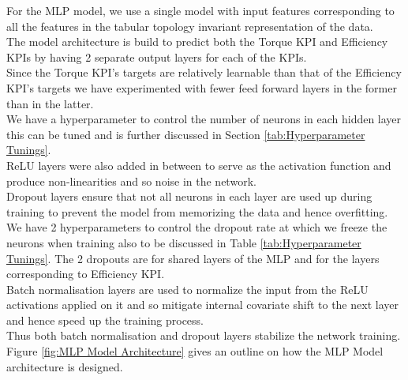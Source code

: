 \documentclass{report} %
\begin{document}
For the \ac{MLP} model, we use a single model with input features corresponding to all the features in the tabular topology invariant representation of the data.\\
The model architecture is build to predict both the Torque \ac{KPI} and Efficiency \ac{KPI}s by having 2 separate output layers for each of the \ac{KPI}s. \\
Since the Torque \ac{KPI}'s targets are relatively learnable than that of the Efficiency \ac{KPI}'s targets we have experimented with fewer feed forward layers in the former than in the latter. \\
We have a hyperparameter to control the number of neurons in each hidden layer this can be tuned and is further discussed in Section \ref{tab:Hyperparameter Tunings}.\\
\ac{ReLU} layers were also added in between to serve as the activation function and produce non-linearities and so noise in the network. \\
Dropout layers ensure that not all neurons in each layer are used up during training to prevent the model from memorizing the data and hence overfitting.  
We have 2 hyperparameters to control the dropout rate at which we freeze the neurons when training also to be discussed in Table \ref{tab:Hyperparameter Tunings}.
The 2 dropouts are for shared layers of the \ac{MLP} and for the layers corresponding to Efficiency \ac{KPI}.\\
Batch normalisation layers are used to normalize the input from the \ac{ReLU} activations applied on it and so mitigate internal covariate shift to the next layer and hence speed up the training process.\\
Thus both batch normalisation and dropout layers stabilize the network training.\\

Figure \ref{fig:MLP Model Architecture} gives an outline on how the \ac{MLP} Model architecture is designed. \\
\end{document}
